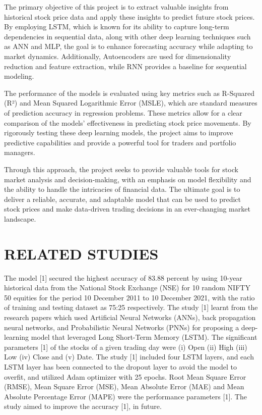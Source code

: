 \documentclass[conference]{IEEEtran}
\begin{document}
The primary objective of this project is to extract valuable insights from historical stock price data and apply these insights to predict future stock prices. By employing LSTM, which is known for its ability to capture long-term dependencies in sequential data, along with other deep learning techniques such as ANN and MLP, the goal is to enhance forecasting accuracy while adapting to market dynamics. Additionally, Autoencoders are used for dimensionality reduction and feature extraction, while RNN provides a baseline for sequential modeling.

The performance of the models is evaluated using key metrics such as R-Squared (R²) and Mean Squared Logarithmic Error (MSLE), which are standard measures of prediction accuracy in regression problems. These metrics allow for a clear comparison of the models' effectiveness in predicting stock price movements. By rigorously testing these deep learning models, the project aims to improve predictive capabilities and provide a powerful tool for traders and portfolio managers.

Through this approach, the project seeks to provide valuable tools for stock market analysis and decision-making, with an emphasis on model flexibility and the ability to handle the intricacies of financial data. The ultimate goal is to deliver a reliable, accurate, and adaptable model that can be used to predict stock prices and make data-driven trading decisions in an ever-changing market landscape.


\section{RELATED STUDIES}

The model [1] secured the highest accuracy of 83.88 percent by using 10-year historical data from the National Stock Exchange (NSE) for 10 random NIFTY 50 equities for the period 10 December 2011 to 10 December 2021, with the ratio of training and testing dataset as 75:25 respectively. The study [1] learnt from the research papers which used Artificial Neural Networks (ANNs), back propagation neural networks, and Probabilistic Neural Networks (PNNs) for proposing a deep-learning model that leveraged Long Short-Term Memory (LSTM). The significant parameters [1] of the stocks of a given trading day were (i) Open (ii) High (iii) Low (iv) Close and (v) Date. The study [1] included four LSTM layers, and each LSTM layer has been connected to the dropout layer to avoid the model to overfit, and utilized Adam optimizer with 25 epochs. Root Mean Square Error (RMSE), Mean Square Error (MSE), Mean Absolute Error (MAE) and Mean Absolute Percentage Error (MAPE) were the performance parameters [1]. The study aimed to improve the accuracy [1], in future.
\end{document}
